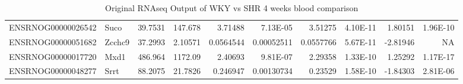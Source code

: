 \begin{sidewaystable}[]
\begin{tabular}{llrrrrrrrr}
ENSRNOG00000026542 & Suco     & 39.7531      & 147.678      & 3.71488    & 7.13E-05   & 3.51275      & 4.10E-11   & 1.80151     & 1.96E-10     \\
ENSRNOG00000051682 & Zcchc9   & 37.2993      & 2.10571      & 0.0564544  & 0.00052511 & 0.0557766    & 5.67E-11   & -2.81946    & NA           \\
ENSRNOG00000017720 & Mxd1     & 486.964      & 1172.09      & 2.40693    & 9.81E-07   & 2.29358      & 1.33E-10   & 1.25292     & 1.17E-17     \\
ENSRNOG00000048277 & Srrt     & 88.2075      & 21.7826      & 0.246947   & 0.00130734 & 0.23529      & 1.58E-10   & -1.84303    & 2.81E-06    
\end{tabular}
\caption{Original RNAseq Output of WKY vs SHR 4 weeks blood comparison}
\label{fig:all1RNAseq}
\end{sidewaystable}

